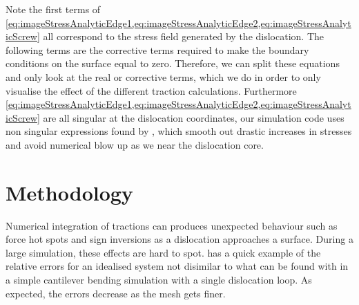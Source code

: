 \documentclass[11pt]{iopart}
\begin{document}
Note the first terms of \cref{eq:imageStressAnalyticEdge1,eq:imageStressAnalyticEdge2,eq:imageStressAnalyticScrew} all correspond to the stress field generated by the dislocation. The following terms are the corrective terms required to make the boundary conditions on the surface equal to zero. Therefore, we can split these equations and only look at the real or corrective terms, which we do in order to only visualise the effect of the different traction calculations. Furthermore \cref{eq:imageStressAnalyticEdge1,eq:imageStressAnalyticEdge2,eq:imageStressAnalyticScrew} are all singular at the dislocation coordinates, our simulation code uses non singular expressions found by \citet{Cai2006}, which smooth out drastic increases in stresses and avoid numerical blow up as we near the dislocation core.

\section{Methodology}\label{s:method}
Numerical integration of tractions can produces unexpected behaviour such as force hot spots and sign inversions as a dislocation approaches a surface. During a large simulation, these effects are hard to spot.  has a quick example of the relative errors for an idealised system not disimilar to what can be found with in a simple cantilever bending simulation with a single dislocation loop. As expected, the errors decrease as the mesh gets finer.
\end{document}
